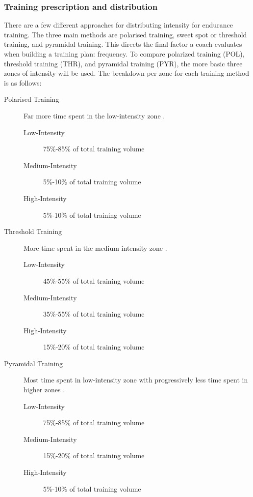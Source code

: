 \subsubsection{Training prescription and distribution}
There are a few different approaches for distributing intensity for endurance training. The three main methods are polarised training, sweet spot or threshold training, and pyramidal training. This directs the final factor a coach evaluates when building a training plan: frequency. To compare polarized training (POL), threshold training (THR), and pyramidal training (PYR), the more basic three zones of intensity will be used. The breakdown per zone for each training method is as follows:
\begin{description}
  \item[Polarised Training] Far more time spent in the low-intensity zone \autocite{Seiler2004}.

  \begin{description}
    \item[Low-Intensity] 75\%-85\% of total training volume
    \item[Medium-Intensity] 5\%-10\% of total training volume
    \item[High-Intensity] 5\%-10\% of total training volume  
  \end{description} 
  \item[Threshold Training] More time spent in the medium-intensity zone \autocite{Seiler2004}.

  \begin{description}
    \item[Low-Intensity] 45\%-55\% of total training volume
    \item[Medium-Intensity] 35\%-55\% of total training volume
    \item[High-Intensity] 15\%-20\% of total training volume  
  \end{description}
  \item[Pyramidal Training] Most time spent in low-intensity zone with progressively less time spent in higher zones \autocite{Selles2019}.

  \begin{description}
    \item[Low-Intensity] 75\%-85\% of total training volume
    \item[Medium-Intensity] 15\%-20\% of total training volume
    \item[High-Intensity] 5\%-10\% of total training volume  
  \end{description}
\end{description}

